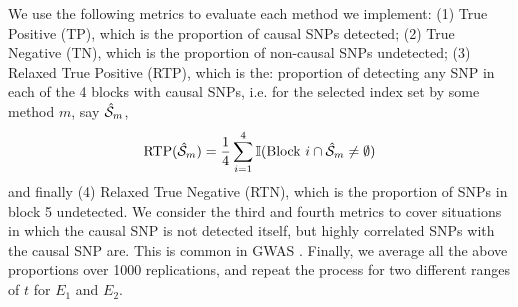 We use the following metrics to evaluate each method we implement: (1) True Positive (TP), which is the proportion of causal SNPs detected;  (2) True Negative (TN), which is the proportion of non-causal SNPs undetected;  (3) Relaxed True Positive (RTP), which is the: proportion of detecting any SNP in each of the 4 blocks with causal SNPs, i.e. for the selected index set by some method $m$, say $\hat {{\cal{S}}}_m$,
%
$$
\text{RTP} ( \hat {{\cal{S}}}_m ) = \frac{1}{4} \sum_{i=1}^4 {\mathbb{I}} ( \text{Block } i \cap \hat {{\cal{S}}}_m \neq \emptyset )
$$
%
and finally (4) Relaxed True Negative (RTN), which is the proportion of SNPs in block 5 undetected. We consider the third and fourth metrics to cover situations in which the causal SNP is not detected itself, but highly correlated SNPs with the causal SNP are. This is common in GWAS \citep{FrommeletEtal12}. Finally, we average all the above proportions over 1000 replications, and repeat the process for two different ranges of $t$ for $E_1$ and $E_2$.


